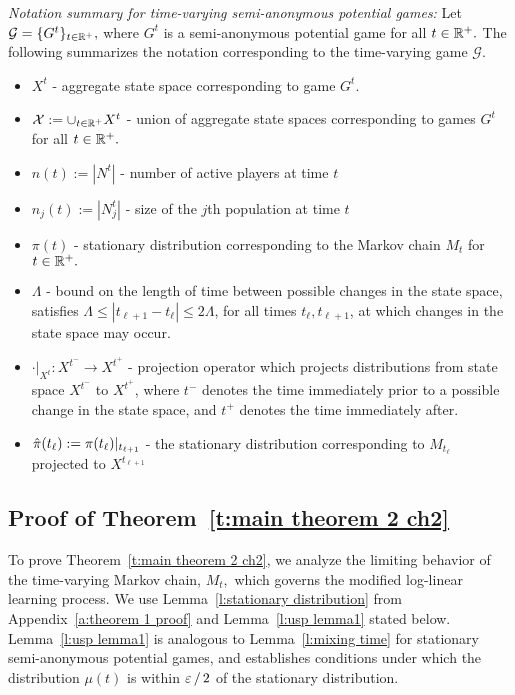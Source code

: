 \noindent\emph{Notation summary for time-varying semi-anonymous potential games:}  Let $\mathcal{G} = \{G^t\}_{t\in \mathbb{R}^+},$ where $G^t$ is a semi-anonymous potential game for all $t\in \mathbb{R}^+.$ The following summarizes the notation corresponding to the time-varying game $\mathcal{G}.$
\begin{itemize}
\item $X^t$ - aggregate state space corresponding to game $G^t.$
\item ${\mathcal X}:= \cup_{t\in \mathbb{R}^+} X^t$ - union of aggregate state spaces corresponding to games $G^t$ for all $t\in \mathbb{R}^+.$
\item $n(t) := |N^t|$ - number of active players at time $t$
\item $n_j(t) := |N_j^t|$ - size of the $j$th population at time $t$
\item $\pi(t)$ - stationary distribution corresponding to the Markov chain $M_t$ for $t\in\mathbb{R}^+.$
\item $\Lambda$ - bound on the length of time between possible changes in the state space, satisfies $\Lambda \leq |t_{\ell +1} - t_{\ell}|\leq 2\Lambda$, for all times $t_{\ell},t_{\ell+1}$, at which changes in the state space may occur.
\item $\cdot |_{X^t} : X^{t^-}\to X^{t^+}$ - projection operator which projects distributions from state space $X^{t^-}$ to $X^{t^+}$, where $t^-$ denotes the time immediately prior to a possible change in the state space, and $t^+$ denotes the time immediately after.
\item $\hat{\pi}(t_{{\ell}}):=\pi(t_{{\ell}})|_{t_{{\ell}+1}}$ - the stationary distribution corresponding to $M_{t_\ell}$ projected to $X^{t_{\ell +1}}$
\end{itemize}



\subsection{Proof of Theorem~\ref{t:main theorem 2 ch2}}\label{a:theorem 2 proof}

To prove Theorem~\ref{t:main theorem 2 ch2}, we analyze the limiting behavior of the time-varying Markov chain, $M_t,$ which governs the modified log-linear learning process. We use Lemma~\ref{l:stationary distribution} from Appendix~\ref{a:theorem 1 proof} and Lemma~\ref{l:usp lemma1} stated below.  
Lemma~\ref{l:usp lemma1} is analogous to Lemma~\ref{l:mixing time} for stationary semi-anonymous potential games, and establishes conditions under which the distribution $\mu(t)$ is within $\varepsilon\mathop{/}2$ of the stationary distribution. 

